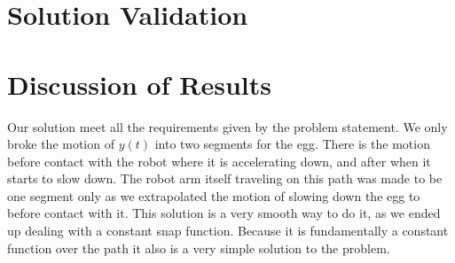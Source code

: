 \documentclass[nofoot,pdf-a,balance,colorlinks,upint,subscriptcorrection,varvw,mathalfa=cal=boondoxo]{asmeconf}
\begin{document}
	
	\section*{Solution Validation}
	
	\section*{Discussion of Results}
	
	Our solution meet all the requirements given by the problem statement. We only broke the motion of $y\left(t\right)$ into two segments for the egg. There is the motion before contact with the robot where it is accelerating down, and after when it starts to slow down. The robot arm itself traveling on this path was made to be one segment only as we extrapolated the motion of slowing down the egg to before contact with it. This solution is a very smooth way to do it, as we ended up dealing with a constant snap function. Because it is fundamentally a constant function over the path it also is a very simple solution to the problem.
	
\end{document}
